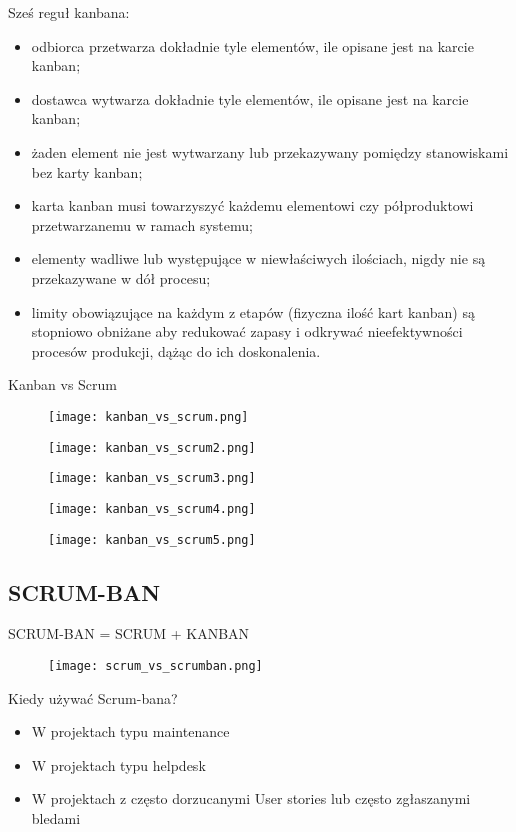 \documentclass[a4paper]{article}
\begin{document}
Sześ reguł kanbana:
    \begin{itemize}
        \item odbiorca przetwarza dokładnie tyle elementów, ile opisane
jest na karcie kanban;
        \item dostawca wytwarza dokładnie tyle elementów, ile opisane jest
na karcie kanban;
        \item żaden element nie jest wytwarzany lub przekazywany
pomiędzy stanowiskami bez karty kanban;
        \item karta kanban musi towarzyszyć każdemu elementowi czy
półproduktowi przetwarzanemu w ramach systemu;
        \item elementy wadliwe lub występujące w niewłaściwych ilościach,
nigdy nie są przekazywane w dół procesu;
        \item limity obowiązujące na każdym z etapów (fizyczna ilość kart
kanban) są stopniowo obniżane aby redukować zapasy i
odkrywać nieefektywności procesów produkcji, dążąc do ich
doskonalenia.
    \end{itemize}

Kanban vs Scrum
\begin{figure}[!h]
    \texttt{[image: kanban\_vs\_scrum.png]}
\end{figure}
\begin{figure}[!h]
    \texttt{[image: kanban\_vs\_scrum2.png]}
\end{figure}
\begin{figure}[!h]
    \texttt{[image: kanban\_vs\_scrum3.png]}
\end{figure}
\begin{figure}[!h]
    \texttt{[image: kanban\_vs\_scrum4.png]}
\end{figure}

\begin{figure}[!h]
    \texttt{[image: kanban\_vs\_scrum5.png]}
\end{figure}

\subsection{SCRUM-BAN}
SCRUM-BAN = SCRUM + KANBAN

\begin{figure}[!h]
    \texttt{[image: scrum\_vs\_scrumban.png]}
\end{figure}


Kiedy używać Scrum-bana?
\begin{itemize}
    \item W projektach typu maintenance
    \item W projektach typu helpdesk
    \item W projektach z często dorzucanymi User stories
lub często zgłaszanymi bledami
\end{itemize}
\end{document}
